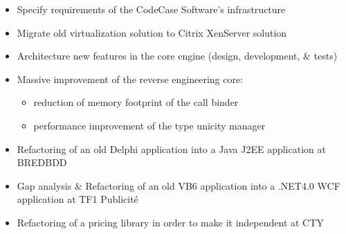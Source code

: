 \documentclass[11pt, a4paper]{moderncv}
\begin{document}
\vspace{1em}
{
  \begin{itemize}
    \renewcommand{\labelitemi}{$\bullet$  }
    \item Specify requirements of the CodeCase Software's infrastructure
    \item Migrate old virtualization solution to Citrix XenServer solution
  \end{itemize}
}
{
  \begin{itemize}
    \renewcommand{\labelitemi}{$\bullet$  }
    \item Architecture new features in the core engine (design, development, \& tests)
    \item Massive improvement of the reverse engineering core:
      \begin{itemize}
        \item reduction of memory footprint of the call binder
        \item performance improvement of the type unicity manager
      \end{itemize}
  \end{itemize}
}
{
  \begin{itemize}
    \renewcommand{\labelitemi}{$\bullet$  }
    \item Refactoring of an old Delphi application into a Java J2EE application at BREDBDD
    \item Gap analysis \& Refactoring of an old VB6 application into a .NET4.0 WCF application at TF1 Publicit\'e
    \item Refactoring of a pricing library in order to make it independent at CTY
  \end{itemize}
}
\end{document}

